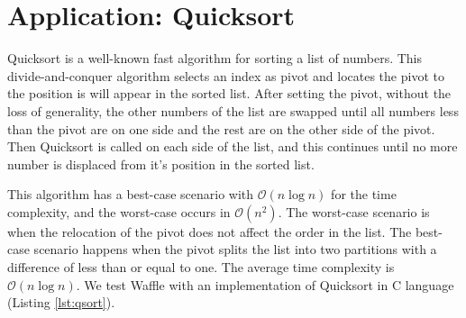 \section{Application: Quicksort}
\label{sec:3-3}

Quicksort \cite{hoare1962quicksort} is a well-known fast algorithm for sorting a list of numbers. This divide-and-conquer algorithm selects an index as pivot and locates the pivot to the position is will appear in the sorted list. After setting the pivot, without the loss of generality, the other numbers of the list are swapped until all numbers less than the pivot are on one side and the rest are on the other side of the pivot. Then Quicksort is called on each side of the list, and this continues until no more number is displaced from it's position in the sorted list.

This algorithm has a best-case scenario with $\mathcal{O}(n\log{}n)$ for the time complexity, and the worst-case occurs in $\mathcal{O}(n^2)$. The worst-case scenario is when the relocation of the pivot does not affect the order in the list. The best-case scenario happens when the pivot splits the list into two partitions with a difference of less than or equal to one. The average time complexity is $\mathcal{O}(n\log{}n)$. We test Waffle with an implementation of Quicksort in C language (Listing \ref{lst:qsort}). 





